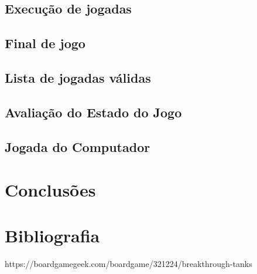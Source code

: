 \documentclass[a4paper,11pt,portuguese]{article}
\begin{document}


    \subsection{Execução de jogadas}



    \subsection{Final de jogo}



    \subsection{Lista de jogadas válidas}



    \subsection{Avaliação do Estado do Jogo}



    \subsection{Jogada do Computador}



\section{Conclusões}



\section{Bibliografia}

https://boardgamegeek.com/boardgame/321224/breakthrough-tanks
\end{document}
